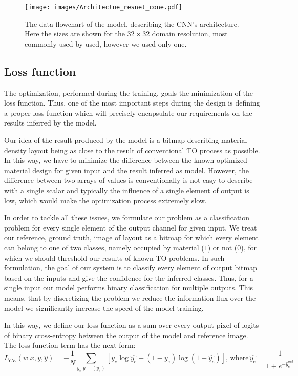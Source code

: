 \begin{figure}
	\centering
	\texttt{[image: images/Architectue\_resnet\_cone.pdf]}
	\label{fig:arch_1}
	\caption{The data flowchart of the model, describing the CNN's architecture. Here the sizes are shown for the $32 \times 32$ domain resolution, most commonly used by used, however we used only one.}
\end{figure}


\subsection{Loss function}

The optimization, performed during the training, goals the minimization of the loss function.
Thus, one of the most important steps during the design is defining a proper loss function which will precisely encapsulate our requirements on the results inferred by the model.
\medskip

Our idea of the result produced by the model is a bitmap describing material density layout being as close to the result of conventional TO process as possible.
In this way, we have to minimize the difference between the known optimized material design for given input and the result inferred as model.
However, the difference between two arrays of values is conventionally is not easy to describe with a single scalar and typically the influence of a single element of output is low, which would make the optimization process extremely slow.
\medskip

In order to tackle all these issues, we formulate our problem as a classification problem for every single element of the output channel for given input. 
We treat our reference, ground truth, image of layout as a bitmap for which every element can belong to one of two classes, namely occupied by material ($1$)  or not ($0$), for which we should threshold our results of known TO problems.
In such formulation, the goal of our system is to classify every element of output bitmap based on the inputs and give the confidence for the inferred classes.
Thus, for a single input our model performs binary classification for multiple outputs.
This means, that by discretizing the problem we reduce the information flux over the model we significantly increase the speed of the model training.
\medskip

In this way, we define our loss function as a sum over every output pixel of logits of binary cross-entropy between the output of the model and reference image.
The loss function term has the next form:
\begin{equation}
 L_{CE}(w|x, y, \hat{y}) = -\frac{1}{N} \sum_{y_{e}|y=(y_{e})}^{} [ y_{e} \log \hat{y_{e}} + (1-y_{e}) \log (1-\hat{y_{e}})] , \, \mathrm{where} \, \hat{y_{e}} = \frac{1}{1+e^{-\hat{y}^{out}_{e}}}
\end{equation}
\medskip

